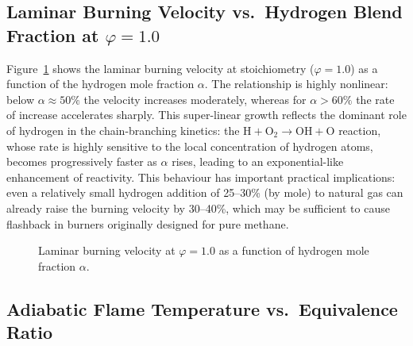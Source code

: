 \documentclass[12pt,a4paper]{article}
\newcommand{\phisym}{\varphi}
\newcommand{\alphasym}{\alpha}
\begin{document}
\subsection{Laminar Burning Velocity vs.\ Hydrogen Blend Fraction at \(\phisym=1.0\)}

Figure~\ref{fig:sl_alpha} shows the laminar burning velocity at stoichiometry (\(\phisym = 1.0\)) as a function of the hydrogen mole fraction \(\alphasym\). The relationship is highly nonlinear: below \(\alphasym \approx 50\%\) the velocity increases moderately, whereas for \(\alphasym > 60\%\) the rate of increase accelerates sharply. This super-linear growth reflects the dominant role of hydrogen in the chain-branching kinetics: the \(\mathrm{H + O_2 \rightarrow OH + O}\) reaction, whose rate is highly sensitive to the local concentration of hydrogen atoms, becomes progressively faster as \(\alphasym\) rises, leading to an exponential-like enhancement of reactivity. This behaviour has important practical implications: even a relatively small hydrogen addition of 25--30\% (by mole) to natural gas can already raise the burning velocity by 30--40\%, which may be sufficient to cause flashback in burners originally designed for pure methane.

\begin{figure}[H]
\centering
{}
\caption{Laminar burning velocity at \(\phisym = 1.0\) as a function of hydrogen mole fraction \(\alpha\).}
\label{fig:sl_alpha}
\end{figure}

\subsection{Adiabatic Flame Temperature vs.\ Equivalence Ratio}
\end{document}
